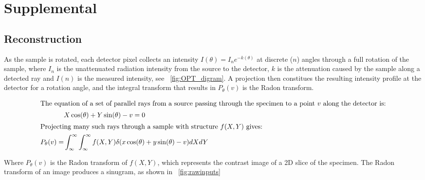 \section{Supplemental}
\subsection{Reconstruction}

As the sample is rotated, each detector pixel collects an intensity \(I(\theta) = I_{n}e^{-k(\theta)}\) at discrete (\(n\)) angles through a full rotation of the sample, where \(I_{n}\) is the unattenuated radiation intensity from the source to the detector, \(k\) is the attenuation caused by the sample along a detected ray and \(I(n)\) is the measured intensity, see \figurename~\ref{fig:OPT_digram}.
A projection then constitues the resulting intensity profile at the detector for a rotation angle, and the integral transform that results in \(P_\theta(v)\)
is the \gls{Radon transform}.

\begin{align}
    \intertext{The equation of a set of parallel rays from a source passing through the specimen to a point \(v\) along the detector is:}
    &X\cos(\theta) + Y\sin(\theta) - v = 0 \\
    \intertext{Projecting many such rays through a sample with structure \(f(X,Y)\) gives:}
    P_\theta(v) = &\int_{\infty}^{\infty} \int_{\infty}^{\infty} f(X,Y)\delta (x\cos(\theta)+y \sin(\theta)-v)dX dY
\end{align}


Where \(P_\theta(v)\) is the \gls{Radon transform} of \(f(X,Y)\), which represents the contrast image of a \gls{2D} slice of the specimen.
The \gls{Radon transform} of an image produces a \gls{sinugram}, as shown in \figurename~\ref{fig:rawinputs}



